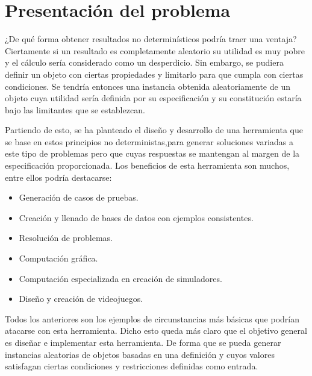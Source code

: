 \chapter{Presentación del problema}\label{chapter:presentacion_del_problema}
¿De qué forma obtener resultados no determinísticos podría traer una ventaja?
Ciertamente si un resultado es completamente aleatorio su utilidad es muy pobre y 
el cálculo sería considerado como un desperdicio. Sin embargo, se pudiera definir
un objeto con ciertas propiedades y limitarlo para que cumpla con ciertas condiciones.
Se tendría entonces una instancia obtenida aleatoriamente de un objeto cuya utilidad sería definida por su especificación y
su constitución estaría bajo las limitantes que se establezcan.

Partiendo de esto, se ha planteado el diseño y desarrollo de una herramienta que se base en
estos principios no deterministas,para generar soluciones variadas
a este tipo de problemas pero que cuyas respuestas se mantengan al margen de la 
especificación proporcionada. Los beneficios de esta herramienta son muchos, entre ellos podría destacarse:

\begin{itemize}
\item {Generación de casos de pruebas.}
\item {Creación y llenado de bases de datos con ejemplos consistentes.}
\item {Resolución de problemas.}
\item {Computación gráfica.}
\item {Computación especializada en creación de simuladores.}
\item {Diseño y creación de videojuegos.}
\end{itemize}

Todos los anteriores son los ejemplos de circunstancias más básicas que podrían atacarse con
esta herramienta. Dicho esto queda más claro que el objetivo general es diseñar e implementar esta 
herramienta. De forma que se pueda generar instancias aleatorias de objetos basadas en una 
definición y cuyos valores satisfagan ciertas condiciones y restricciones definidas como entrada.

